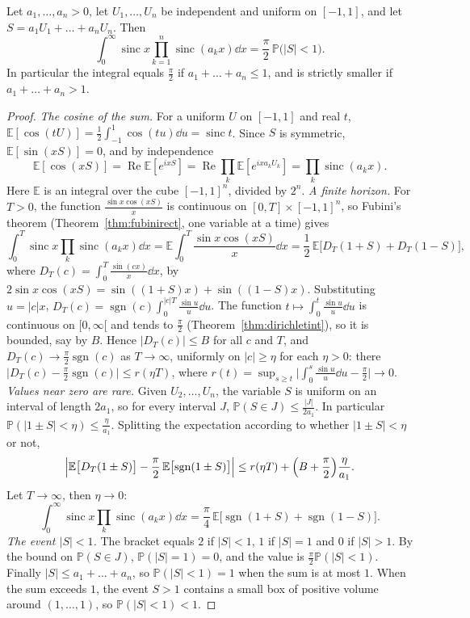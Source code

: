 \begin{theorem}\label{conjectures:thm:borwein}
Let $a_1,\dots,a_n>0$, let $U_1,\dots,U_n$ be independent and uniform on $[-1,1]$, and let $S=a_1U_1+\dots+a_nU_n$. Then
\[
\int_0^\infty\operatorname{sinc}x\prod_{k=1}^n\operatorname{sinc}(a_kx)\dd x=\frac\pi2\,\mathbb P\bigl(|S|<1\bigr).
\]
In particular the integral equals $\frac\pi2$ if $a_1+\dots+a_n\le1$, and is strictly smaller if $a_1+\dots+a_n>1$.
\end{theorem}
\begin{proof}
\emph{The cosine of the sum.}
For a uniform $U$ on $[-1,1]$ and real $t$, $\mathbb E[\cos(tU)]=\frac12\int_{-1}^1\cos(tu)\dd u=\operatorname{sinc}t$. Since $S$ is symmetric,
$\mathbb E[\sin(xS)]=0$, and by independence
\[
\mathbb E[\cos(xS)]=\operatorname{Re}\mathbb E[e^{ixS}]=\operatorname{Re}\prod_k\mathbb E[e^{ixa_kU_k}]=\prod_k\operatorname{sinc}(a_kx).
\]
Here $\mathbb E$ is an integral over the cube $[-1,1]^n$, divided by $2^n$.
\emph{A finite horizon.}
For $T>0$, the function $\frac{\sin x\cos(xS)}x$ is continuous on $[0,T]\times[-1,1]^n$, so
Fubini's theorem (Theorem~\ref{thm:fubinirect}, one variable at a time) gives
\[
\int_0^T\operatorname{sinc}x\prod_k\operatorname{sinc}(a_kx)\dd x=\mathbb E\int_0^T\frac{\sin x\cos(xS)}x\dd x=\frac12\,\mathbb E\bigl[D_T(1+S)+D_T(1-S)\bigr],
\]
where $D_T(c)=\int_0^T\frac{\sin(cx)}x\dd x$, by $2\sin x\cos(xS)=\sin((1+S)x)+\sin((1-S)x)$. Substituting $u=|c|x$, $D_T(c)=\operatorname{sgn}(c)\int_0^{|c|T}\frac{\sin u}u\dd u$.
The function $t\mapsto\int_0^t\frac{\sin u}u\dd u$ is continuous on $[0,\infty[$ and tends to $\frac\pi2$ (Theorem~\ref{thm:dirichletint}), so it is bounded, say by $B$.
Hence $|D_T(c)|\le B$ for all $c$ and $T$, and $D_T(c)\to\frac\pi2\operatorname{sgn}(c)$ as $T\to\infty$, uniformly on $|c|\ge\eta$ for each $\eta>0$: there
$\bigl|D_T(c)-\frac\pi2\operatorname{sgn}(c)\bigr|\le r(\eta T)$, where $r(t)=\sup_{s\ge t}\bigl|\int_0^s\frac{\sin u}u\dd u-\frac\pi2\bigr|\to0$.
\emph{Values near zero are rare.}
Given $U_2,\dots,U_n$, the variable $S$ is uniform on an interval of length $2a_1$, so for every interval $J$,
$\mathbb P(S\in J)\le\frac{|J|}{2a_1}$. In particular $\mathbb P(|1\pm S|<\eta)\le\frac\eta{a_1}$. Splitting the expectation according to whether $|1\pm S|<\eta$ or not,
\[
\Bigl|\mathbb E\bigl[D_T(1\pm S)\bigr]-\frac\pi2\,\mathbb E\bigl[\operatorname{sgn}(1\pm S)\bigr]\Bigr|\le r(\eta T)+\Bigl(B+\frac\pi2\Bigr)\frac\eta{a_1}.
\]
Let $T\to\infty$, then $\eta\to0$:
\[
\int_0^\infty\operatorname{sinc}x\prod_k\operatorname{sinc}(a_kx)\dd x=\frac\pi4\,\mathbb E\bigl[\operatorname{sgn}(1+S)+\operatorname{sgn}(1-S)\bigr].
\]
\emph{The event $|S|<1$.}
The bracket equals $2$ if $|S|<1$, $1$ if $|S|=1$ and $0$ if $|S|>1$. By the bound on $\mathbb P(S\in J)$, $\mathbb P(|S|=1)=0$, and the value is
$\frac\pi2\mathbb P(|S|<1)$. Finally $|S|\le a_1+\dots+a_n$, so $\mathbb P(|S|<1)=1$ when the sum is at most $1$. When the sum exceeds $1$, the event
$S>1$ contains a small box of positive volume around $(1,\dots,1)$, so $\mathbb P(|S|<1)<1$.
\end{proof}

